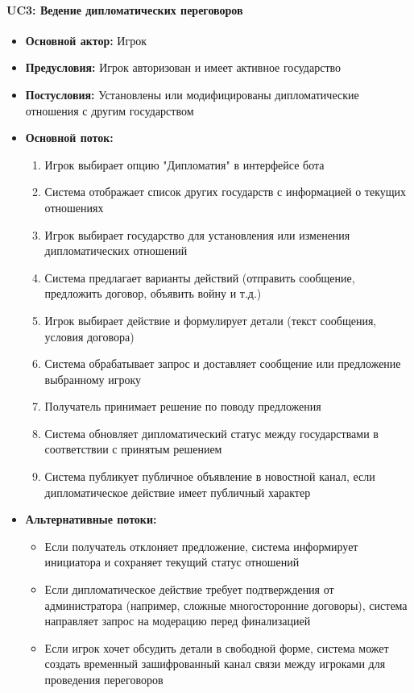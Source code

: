 \paragraph{UC3: Ведение дипломатических переговоров}

\begin{itemize}
    \item \textbf{Основной актор:} Игрок
    \item \textbf{Предусловия:} Игрок авторизован и имеет активное государство
    \item \textbf{Постусловия:} Установлены или модифицированы дипломатические отношения с другим государством
    \item \textbf{Основной поток:}
    \begin{enumerate}
        \item Игрок выбирает опцию "Дипломатия" в интерфейсе бота
        \item Система отображает список других государств с информацией о текущих отношениях
        \item Игрок выбирает государство для установления или изменения дипломатических отношений
        \item Система предлагает варианты действий (отправить сообщение, предложить договор, объявить войну и т.д.)
        \item Игрок выбирает действие и формулирует детали (текст сообщения, условия договора)
        \item Система обрабатывает запрос и доставляет сообщение или предложение выбранному игроку
        \item Получатель принимает решение по поводу предложения
        \item Система обновляет дипломатический статус между государствами в соответствии с принятым решением
        \item Система публикует публичное объявление в новостной канал, если дипломатическое действие имеет публичный характер
    \end{enumerate}
    \item \textbf{Альтернативные потоки:}
    \begin{itemize}
        \item Если получатель отклоняет предложение, система информирует инициатора и сохраняет текущий статус отношений
        \item Если дипломатическое действие требует подтверждения от администратора (например, сложные многосторонние договоры), система направляет запрос на модерацию перед финализацией
        \item Если игрок хочет обсудить детали в свободной форме, система может создать временный зашифрованный канал связи между игроками для проведения переговоров
    \end{itemize}
\end{itemize}

